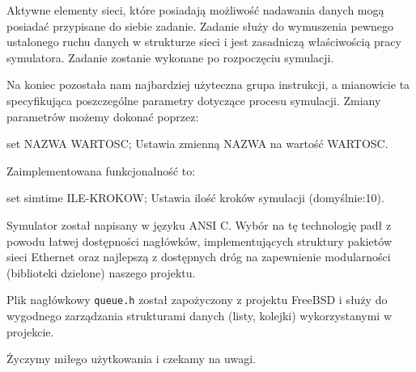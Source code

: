 \noindent
Aktywne elementy sieci, które posiadają możliwość nadawania danych mogą
posiadać przypisane do siebie zadanie. Zadanie służy do wymuszenia pewnego
ustalonego ruchu danych w strukturze sieci i jest zasadniczą właściwością
pracy symulatora. Zadanie zostanie wykonane po rozpoczęciu symulacji.

\noindent
Na koniec pozostała nam najbardziej użyteczna grupa instrukcji, a mianowicie
ta specyfikująca poszczególne parametry dotyczące procesu symulacji. Zmiany
parametrów możemy dokonać poprzez:

\mytt set NAZWA WARTOSC; Ustawia zmienną NAZWA na wartość WARTOSC.

\noindent
Zaimplementowana funkcjonalność to:

\mytt set simtime ILE-KROKOW; Ustawia ilość kroków symulacji (domyślnie:10).

\noindent
Symulator został napisany w języku ANSI C. Wybór na tę technologię padł z
powodu łatwej dostępności nagłówków, implementujących struktury pakietów
sieci Ethernet oraz najlepszą z dostępnych dróg na zapewnienie modularności
(biblioteki dzielone) naszego projektu.



Plik nagłówkowy {\tt queue.h} został zapożyczony z projektu FreeBSD i służy
do wygodnego zarządzania strukturami danych (listy, kolejki) wykorzystanymi
w projekcie.

{}

\noindent Życzymy miłego użytkowania i czekamy na uwagi.
\bigskip
\bigskip
{}
\smallskip
{}

\bye
